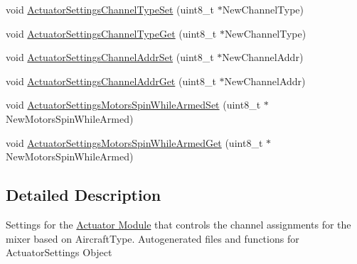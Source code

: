\begin{DoxyCompactItemize}
\item 
void \hyperlink{group___actuator_settings_gab2d6260b6817564150c1077f555b38c8}{\-Actuator\-Settings\-Channel\-Type\-Set} (uint8\-\_\-t $\ast$\-New\-Channel\-Type)
\item 
void \hyperlink{group___actuator_settings_ga37c0234c7e7770bef3d0036dd585bf06}{\-Actuator\-Settings\-Channel\-Type\-Get} (uint8\-\_\-t $\ast$\-New\-Channel\-Type)
\item 
void \hyperlink{group___actuator_settings_gaa559daac4617e2a6eb10df0bf6814c6b}{\-Actuator\-Settings\-Channel\-Addr\-Set} (uint8\-\_\-t $\ast$\-New\-Channel\-Addr)
\item 
void \hyperlink{group___actuator_settings_ga41bcc5239a854734ef3553a9f158b565}{\-Actuator\-Settings\-Channel\-Addr\-Get} (uint8\-\_\-t $\ast$\-New\-Channel\-Addr)
\item 
void \hyperlink{group___actuator_settings_ga375cffc299d67ebc95187cc12cdca780}{\-Actuator\-Settings\-Motors\-Spin\-While\-Armed\-Set} (uint8\-\_\-t $\ast$\-New\-Motors\-Spin\-While\-Armed)
\item 
void \hyperlink{group___actuator_settings_gafa1037219f82f9c99305a5a7e434ca20}{\-Actuator\-Settings\-Motors\-Spin\-While\-Armed\-Get} (uint8\-\_\-t $\ast$\-New\-Motors\-Spin\-While\-Armed)
\end{DoxyCompactItemize}


\subsection{\-Detailed \-Description}
\-Settings for the \hyperlink{group___actuator_module}{\-Actuator \-Module} that controls the channel assignments for the mixer based on \-Aircraft\-Type. \-Autogenerated files and functions for \-Actuator\-Settings \-Object 

